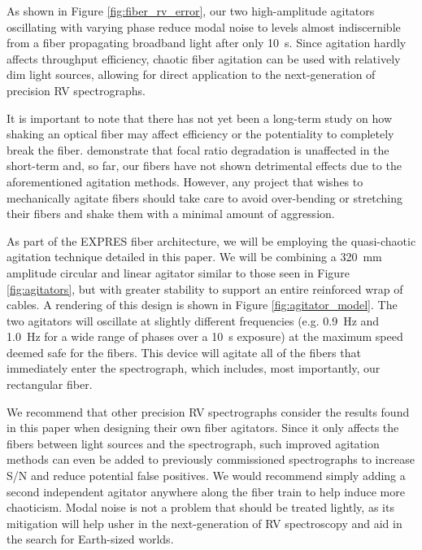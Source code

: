 \documentclass[twocolumn]{emulateapj}
\begin{document}
As shown in Figure \ref{fig:fiber_rv_error}, our two high-amplitude agitators oscillating with varying phase reduce modal noise to levels almost indiscernible from a fiber propagating broadband light after only \SI{10}{\second}. Since agitation hardly affects throughput efficiency, chaotic fiber agitation can be used with relatively dim light sources, allowing for direct application to the next-generation of precision RV spectrographs.

It is important to note that there has not yet been a long-term study on how shaking an optical fiber may affect efficiency or the potentiality to completely break the fiber. \citet{Sablowski2015} demonstrate that focal ratio degradation is unaffected in the short-term and, so far, our fibers have not shown detrimental effects due to the aforementioned agitation methods. However, any project that wishes to mechanically agitate fibers should take care to avoid over-bending or stretching their fibers and shake them with a minimal amount of aggression.

As part of the EXPRES fiber architecture, we will be employing the quasi-chaotic agitation technique detailed in this paper. We will be combining a \SI{320}{\milli\meter} amplitude circular and linear agitator similar to those seen in Figure \ref{fig:agitators}, but with greater stability to support an entire reinforced wrap of cables. A rendering of this design is shown in Figure \ref{fig:agitator_model}. The two agitators will oscillate at slightly different frequencies (e.g. \SI{0.9}{\hertz} and \SI{1.0}{\hertz} for a wide range of phases over a \SI{10}{\second} exposure) at the maximum speed deemed safe for the fibers. This device will agitate all of the fibers that immediately enter the spectrograph, which includes, most importantly, our rectangular fiber.

We recommend that other precision RV spectrographs consider the results found in this paper when designing their own fiber agitators. Since it only affects the fibers between light sources and the spectrograph, such improved agitation methods can even be added to previously commissioned spectrographs to increase S/N and reduce potential false positives. We would recommend simply adding a second independent agitator anywhere along the fiber train to help induce more chaoticism. Modal noise is not a problem that should be treated lightly, as its mitigation will help usher in the next-generation of RV spectroscopy and aid in the search for Earth-sized worlds.

\acknowledgments
\end{document}
